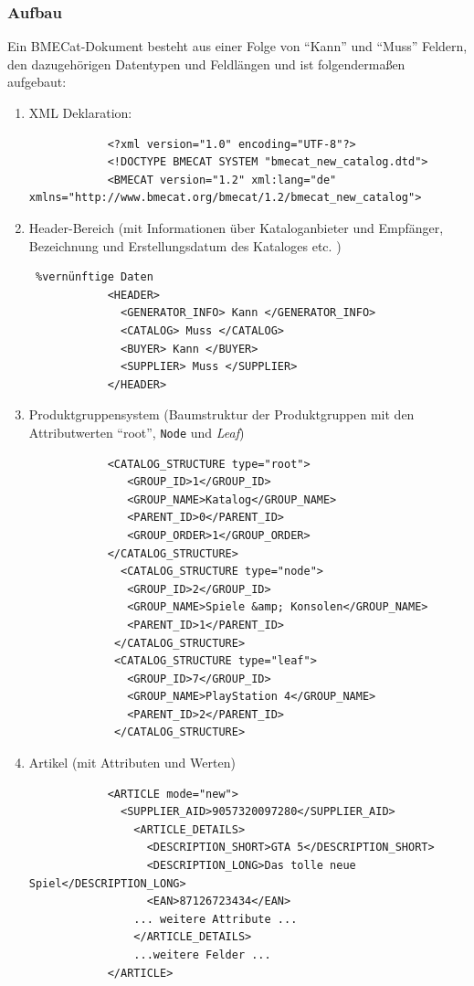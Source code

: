 	\subsubsection{Aufbau}
	
	Ein BMECat-Dokument besteht aus einer Folge von \enquote{Kann} und \enquote{Muss} Feldern, den dazugehörigen Datentypen und Feldlängen und ist folgendermaßen aufgebaut:
		
		\begin{enumerate}
		
			\item 
			XML Deklaration:
			\begin{lstlisting}
			<?xml version="1.0" encoding="UTF-8"?>
			<!DOCTYPE BMECAT SYSTEM "bmecat_new_catalog.dtd">
			<BMECAT version="1.2" xml:lang="de" xmlns="http://www.bmecat.org/bmecat/1.2/bmecat_new_catalog">
			\end{lstlisting}
			
			\item
			Header-Bereich (mit Informationen über Kataloganbieter und Empfänger, Bezeichnung und Erstellungsdatum des Kataloges etc.  )
			\begin{lstlisting} %vernünftige Daten
			<HEADER> 
			  <GENERATOR_INFO> Kann </GENERATOR_INFO>
			  <CATALOG> Muss </CATALOG>
			  <BUYER> Kann </BUYER>
			  <SUPPLIER> Muss </SUPPLIER>
			</HEADER>
			\end{lstlisting}
			\pagebreak
			\item Produktgruppensystem (Baumstruktur der Produktgruppen mit den Attributwerten \enquote{root}, \texttt{Node} und \textit{Leaf})
			\begin{lstlisting}
			<CATALOG_STRUCTURE type="root">
			   <GROUP_ID>1</GROUP_ID>
			   <GROUP_NAME>Katalog</GROUP_NAME>
			   <PARENT_ID>0</PARENT_ID>
			   <GROUP_ORDER>1</GROUP_ORDER>
			</CATALOG_STRUCTURE>
			  <CATALOG_STRUCTURE type="node">
			   <GROUP_ID>2</GROUP_ID>
			   <GROUP_NAME>Spiele &amp; Konsolen</GROUP_NAME>
			   <PARENT_ID>1</PARENT_ID>
			 </CATALOG_STRUCTURE>
			 <CATALOG_STRUCTURE type="leaf">
			   <GROUP_ID>7</GROUP_ID>
			   <GROUP_NAME>PlayStation 4</GROUP_NAME>
			   <PARENT_ID>2</PARENT_ID>
			 </CATALOG_STRUCTURE>
			\end{lstlisting}
			
			
			
			\item Artikel (mit Attributen und Werten)
			
			\begin{lstlisting}
			<ARTICLE mode="new">
			  <SUPPLIER_AID>9057320097280</SUPPLIER_AID>
			    <ARTICLE_DETAILS>
			      <DESCRIPTION_SHORT>GTA 5</DESCRIPTION_SHORT>
			      <DESCRIPTION_LONG>Das tolle neue Spiel</DESCRIPTION_LONG>
			      <EAN>87126723434</EAN>
				... weitere Attribute ...
			    </ARTICLE_DETAILS>
				...weitere Felder ...
			</ARTICLE>
			\end{lstlisting}
			

\end{enumerate}
